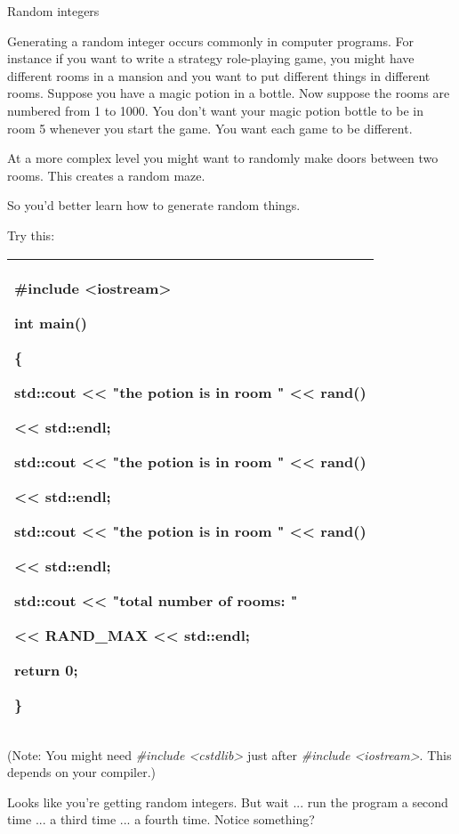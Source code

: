 \documentclass[
]{article}
\begin{document}
Random integers

Generating a random integer occurs commonly in computer programs. For
instance if you want to write a strategy role-playing game, you might
have different rooms in a mansion and you want to put different things
in different rooms. Suppose you have a magic potion in a bottle. Now
suppose the rooms are numbered from 1 to 1000. You don't want your magic
potion bottle to be in room 5 whenever you start the game. You want each
game to be different.

At a more complex level you might want to randomly make doors between
two rooms. This creates a random maze.

So you'd better learn how to generate random things.

Try this:

\begin{longtable}[]{@{}l@{}}
\toprule
\endhead
\begin{minipage}[t]{0.97\columnwidth}\raggedright
\#include \textless iostream\textgreater{}

int main()

\{

std::cout \textless\textless{} "the potion is in room "
\textless\textless{} \textbf{rand()}

\textless\textless{} std::endl;

std::cout \textless\textless{} "the potion is in room "
\textless\textless{} \textbf{rand()}

\textless\textless{} std::endl;

std::cout \textless\textless{} "the potion is in room "
\textless\textless{} \textbf{rand()}

\textless\textless{} std::endl;

std::cout \textless\textless{} "total number of rooms: "

\textless\textless{} \textbf{RAND\_MAX} \textless\textless{} std::endl;

return 0;

\}\strut
\end{minipage}\tabularnewline
\bottomrule
\end{longtable}

(Note: You might need \emph{\#include \textless cstdlib\textgreater{}}
just after \emph{\#include \textless iostream\textgreater{}}. This
depends on your compiler.)

Looks like you're getting random integers. But wait ... run the program
a second time ... a third time ... a fourth time. Notice something?
\end{document}
